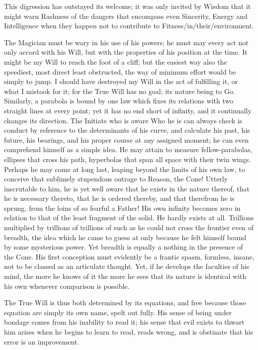 This digression has outstayed its welcome; it was only invited by Wisdom that it might warn Rashness of the dangers that encompass even Sincerity, Energy and Intelligence when they happen not to contribute to Fitness\-/in\-/their\-/environment.

The Magician must be wary in his use of his powers; he must may every act not only accord with his Will, but with the properties of his position at the time. It might be my Will to reach the foot of a cliff; but the easiest way \textemdash{} also the speediest, most direct least obstructed, the way of minimum effort \textemdash{} would be simply to jump. I should have destroyed my Will in the act of fulfilling it, or what I mistook for it; for the True Will has no goal; its nature being to Go. Similarly, a parabola is bound by one law which fixes its relations with two straight lines at every point; yet it has no end short of infinity, and it continually changes its direction. The Initiate who is aware Who he is can always check is conduct by reference to the determinants of his curve, and calculate his past, his future, his bearings, and his proper course at any assigned moment; he can even comprehend himself as a simple idea. He may attain to measure fellow-parabolas, ellipses that cross his path, hyperbolas that span all space with their twin wings. Perhaps he may come at long last, leaping beyond the limits of his own law, to conceive that sublimely stupendous outrage to Reason, the Cone! Utterly inscrutable to him, he is yet well aware that he exists in the nature thereof, that he is necessary thereto, that he is ordered thereby, and that therefrom he is sprung, from the loins of so fearful a Father! His own infinity becomes zero in relation to that of the least fragment of the solid. He hardly exists at all. Trillions multiplied by trillions of trillions of such as he could not cross the frontier even of breadth, the idea which he came to guess at only because he felt himself bound by some mysterious power. Yet breadth is equally a nothing in the presence of the Cone. His first conception must evidently be a frantic spasm, formless, insane, not to be classed as an articulate thought. Yet, if he develops the faculties of his mind, the more he knows of it the more he sees that its nature is identical with his own whenever comparison is possible.

The True Will is thus both determined by its equations, and free because those equation are simply its own name, spelt out fully. His sense of being under bondage comes from his inability to read it; his sense that evil exists to thwart him arises when he begins to learn to read, reads wrong, and is obstinate that his error is an improvement.

